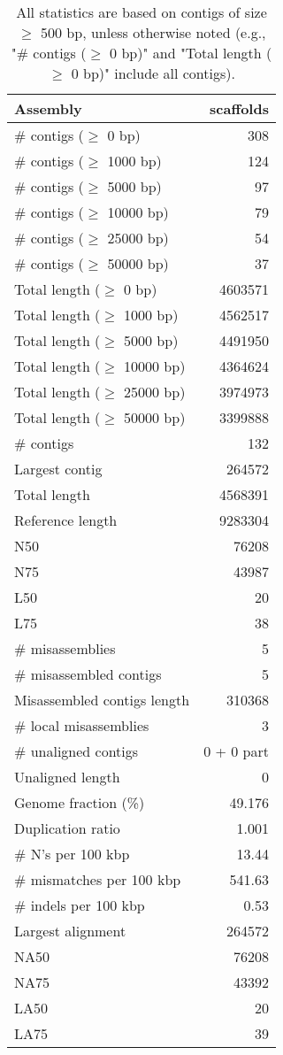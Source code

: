 \documentclass[12pt,a4paper]{article}
\begin{document}
\begin{table}[ht]
\begin{center}
\caption{All statistics are based on contigs of size $\geq$ 500 bp, unless otherwise noted (e.g., "\# contigs ($\geq$ 0 bp)" and "Total length ($\geq$ 0 bp)" include all contigs).}
\begin{tabular}{|l*{1}{|r}|}
\hline
Assembly & scaffolds \\ \hline
\# contigs ($\geq$ 0 bp) & 308 \\ \hline
\# contigs ($\geq$ 1000 bp) & 124 \\ \hline
\# contigs ($\geq$ 5000 bp) & 97 \\ \hline
\# contigs ($\geq$ 10000 bp) & 79 \\ \hline
\# contigs ($\geq$ 25000 bp) & 54 \\ \hline
\# contigs ($\geq$ 50000 bp) & 37 \\ \hline
Total length ($\geq$ 0 bp) & 4603571 \\ \hline
Total length ($\geq$ 1000 bp) & 4562517 \\ \hline
Total length ($\geq$ 5000 bp) & 4491950 \\ \hline
Total length ($\geq$ 10000 bp) & 4364624 \\ \hline
Total length ($\geq$ 25000 bp) & 3974973 \\ \hline
Total length ($\geq$ 50000 bp) & 3399888 \\ \hline
\# contigs & 132 \\ \hline
Largest contig & 264572 \\ \hline
Total length & 4568391 \\ \hline
Reference length & 9283304 \\ \hline
N50 & 76208 \\ \hline
N75 & 43987 \\ \hline
L50 & 20 \\ \hline
L75 & 38 \\ \hline
\# misassemblies & 5 \\ \hline
\# misassembled contigs & 5 \\ \hline
Misassembled contigs length & 310368 \\ \hline
\# local misassemblies & 3 \\ \hline
\# unaligned contigs & 0 + 0 part \\ \hline
Unaligned length & 0 \\ \hline
Genome fraction (\%) & 49.176 \\ \hline
Duplication ratio & 1.001 \\ \hline
\# N's per 100 kbp & 13.44 \\ \hline
\# mismatches per 100 kbp & 541.63 \\ \hline
\# indels per 100 kbp & 0.53 \\ \hline
Largest alignment & 264572 \\ \hline
NA50 & 76208 \\ \hline
NA75 & 43392 \\ \hline
LA50 & 20 \\ \hline
LA75 & 39 \\ \hline
\end{tabular}
\end{center}
\end{table}
\end{document}
